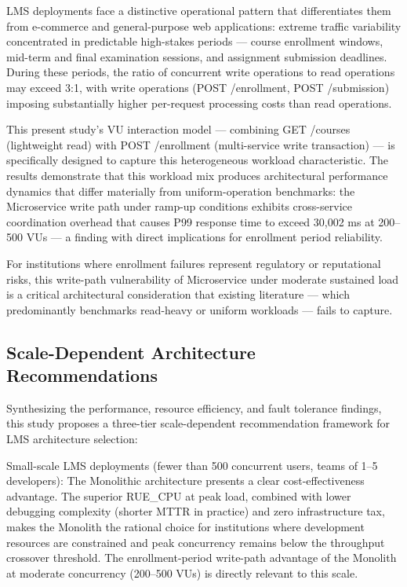 LMS deployments face a distinctive operational pattern that differentiates them from e-commerce and general-purpose web applications: extreme traffic variability concentrated in predictable high-stakes periods — course enrollment windows, mid-term and final examination sessions, and assignment submission deadlines. During these periods, the ratio of concurrent write operations to read operations may exceed 3:1, with write operations (POST /enrollment, POST /submission) imposing substantially higher per-request processing costs than read operations.

This present study's VU interaction model — combining GET /courses (lightweight read) with POST /enrollment (multi-service write transaction) — is specifically designed to capture this heterogeneous workload characteristic. The results demonstrate that this workload mix produces architectural performance dynamics that differ materially from uniform-operation benchmarks: the Microservice write path under ramp-up conditions exhibits cross-service coordination overhead that causes P99 response time to exceed 30,002 ms at 200–500 VUs — a finding with direct implications for enrollment period reliability.

For institutions where enrollment failures represent regulatory or reputational risks, this write-path vulnerability of Microservice under moderate sustained load is a critical architectural consideration that existing literature — which predominantly benchmarks read-heavy or uniform workloads — fails to capture.

\subsection{Scale-Dependent Architecture Recommendations}

Synthesizing the performance, resource efficiency, and fault tolerance findings, this study proposes a three-tier scale-dependent recommendation framework for LMS architecture selection:

Small-scale LMS deployments (fewer than 500 concurrent users, teams of 1–5 developers): The Monolithic architecture presents a clear cost-effectiveness advantage. The superior RUE\_CPU at peak load, combined with lower debugging complexity (shorter MTTR in practice) and zero infrastructure tax, makes the Monolith the rational choice for institutions where development resources are constrained and peak concurrency remains below the throughput crossover threshold. The enrollment-period write-path advantage of the Monolith at moderate concurrency (200–500 VUs) is directly relevant to this scale.

